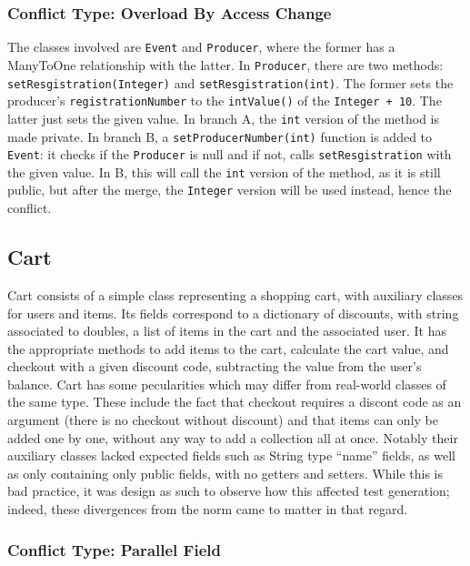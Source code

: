 \subsubsection{Conflict Type: Overload By Access Change}

The classes involved are \texttt{Event} and \texttt{Producer}, where the former has a ManyToOne relationship with the latter.
In \texttt{Producer}, there are two methods: \texttt{setResgistration(Integer)} and \texttt{setResgistration(int)}. The former sets
the producer's \texttt{registrationNumber} to the \texttt{intValue()} of the \texttt{Integer + 10}. The latter just sets the given value.
In branch A, the \texttt{int} version of the method is made private. In branch B, a \texttt{setProducerNumber(int)} function is added
to \texttt{Event}: it checks if the \texttt{Producer} is null and if not, calls \texttt{setResgistration} with the given value. In B, this will
call the \texttt{int} version of the method, as it is still public, but after the merge, the \texttt{Integer} version will be used instead,
hence the conflict.

\subsection{Cart}

Cart consists of a simple class representing a shopping cart, with auxiliary classes for users and items.
Its fields correspond to a dictionary of discounts, with string associated to doubles, a list of items in the cart
and the associated user.
It has the appropriate methods to add items to the cart, calculate the cart value, and checkout with a given discount code,
subtracting the value from the user's balance.
Cart has some pecularities which may differ from real-world classes of the same type. These include the fact that checkout
requires a discont code as an argument (there is no checkout without discount) and that items can only be added one by one, without
any way to add a collection all at once.  Notably their auxiliary classes lacked expected fields such as String type ``name'' fields,
as well as only containing only public fields, with no getters and setters. While this is bad practice, it was design as such to
observe how this affected test generation; indeed, these divergences from the norm came to matter in that regard.

\subsubsection{Conflict Type: Parallel Field}

